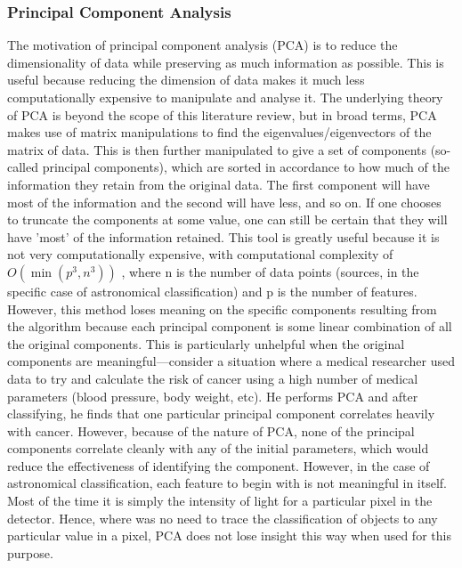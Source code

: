 \documentclass[a4paper,11pt]{article}
\begin{document}
\subsubsection{Principal Component Analysis}
The motivation of principal component analysis (PCA) is to reduce the dimensionality of data while preserving as much information as possible. This is useful because reducing the dimension of data makes it much less computationally expensive to manipulate and analyse it. The underlying theory of PCA is beyond the scope of this literature review, but in broad terms, PCA makes use of matrix manipulations to find the eigenvalues/eigenvectors of the matrix of data. This is then further manipulated to give a set of components (so-called principal components), which are sorted in accordance to how much of the information they retain from the original data. The first component will have most of the information and the second will have less, and so on. If one chooses to truncate the components at some value, one can still be certain that they will have 'most' of the information retained. This tool is greatly useful because it is not very computationally expensive, with computational complexity of $O(\min(p^3,n^3))$ \cite{johnstone_2009_on}, where n is the number of data points (sources, in the specific case of astronomical classification) and p is the number of features. However, this method loses meaning on the specific components resulting from the algorithm because each principal component is some linear combination of all the original components. This is particularly unhelpful when the original components are meaningful—consider a situation where a medical researcher used data to try and calculate the risk of cancer using a high number of medical parameters (blood pressure, body weight, etc). He performs PCA and after classifying, he finds that one particular principal component correlates heavily with cancer. However, because of the nature of PCA, none of the principal components correlate cleanly with any of the initial parameters, which would reduce the effectiveness of identifying the component. However, in the case of astronomical classification, each feature to begin with is not meaningful in itself. Most of the time it is simply the intensity of light for a particular pixel in the detector. Hence, where was no need to trace the classification of objects to any particular value in a pixel, PCA does not lose insight this way when used for this purpose.
\end{document}
